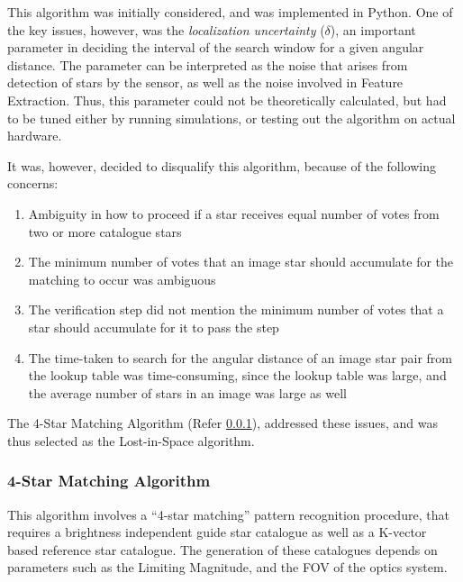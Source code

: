 \documentclass[../../main.tex]{subfiles}
\begin{document}

This algorithm was initially considered, and was implemented in Python.
One of the key issues, however, was the \textit{localization uncertainty} ($\delta$), an important parameter in deciding the interval of the search window for a given angular distance. 
The parameter can be interpreted as the noise that arises from detection of stars by the sensor, as well as the noise involved in Feature Extraction. Thus, this parameter could not be theoretically calculated, but had to be tuned either by running simulations, or testing out the algorithm on actual hardware.

It was, however, decided to disqualify this algorithm, because of the following concerns:
\begin{enumerate}
    \item Ambiguity in how to proceed if a star receives equal number of votes from two or more catalogue stars
    
    \item The minimum number of votes that an image star should accumulate for the matching to occur was ambiguous
    
    \item The verification step did not mention the minimum number of votes that a star should accumulate for it to pass the step
    
    \item The time-taken to search for the angular distance of an image star pair from the lookup table was time-consuming, since the lookup table was large, and the average number of stars in an image was large as well 
\end{enumerate}

The 4-Star Matching Algorithm (Refer \ref{sec:4SM}), addressed these issues, and was thus selected as the Lost-in-Space algorithm.


\subsubsection{4-Star Matching Algorithm}
\label{sec:4SM}

This algorithm \cite{dong2006brightness} involves a “4-star matching” pattern recognition procedure, that requires a  brightness independent guide star catalogue as well as a K-vector based reference star catalogue. The generation of these catalogues depends on parameters such as the Limiting Magnitude, and the FOV of the optics system.
\end{document}

